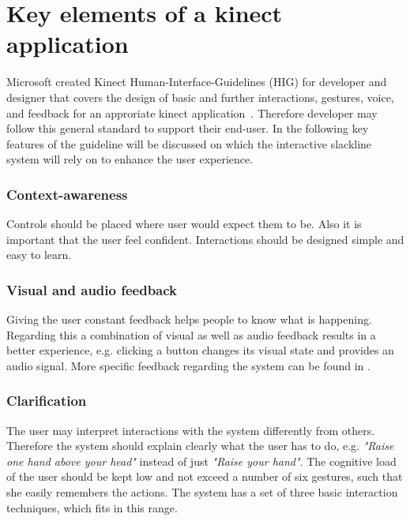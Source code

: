 \section{Key elements of a kinect application}\label{4_1_requirements}
Microsoft created Kinect Human-Interface-Guidelines (HIG) for developer and designer that covers the design of basic and further interactions, gestures, voice, and feedback for an approriate kinect application~\cite{MicrosoftHIG2014-mh}. Therefore developer may follow this general standard to support their end-user. In the following key features of the guideline will be discussed on which the interactive slackline system will rely on to enhance the user experience.

\subsubsection{Context-awareness}
Controls should be placed where user would expect them to be. Also it is important that the user feel confident. Interactions should be designed simple and easy to learn.

\subsubsection{Visual and audio feedback}
Giving the user constant feedback helps people to know what is happening. Regarding this a combination of visual as well as audio feedback results in a better experience, e.g. clicking a button changes its visual state and provides an audio signal. More specific feedback regarding the system can be found in \textbf{}.

\subsubsection{Clarification}
The user may interpret interactions with the system differently from others. Therefore the system should explain clearly what the user has to do, e.g. \textit{"Raise one hand above your head"} instead of just \textit{"Raise your hand"}. The cognitive load of the user should be kept low and not exceed a number of six gestures, such that she easily remembers the actions. The system has a set of three basic interaction techniques, which fits in this range.

